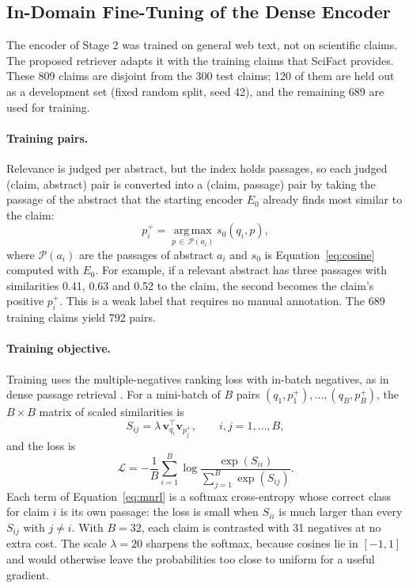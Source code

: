 \subsection{In-Domain Fine-Tuning of the Dense Encoder}
\label{sec:finetune}

The encoder of Stage 2 was trained on general web text, not on scientific claims. The proposed
retriever adapts it with the training claims that SciFact provides. These 809 claims are
disjoint from the 300 test claims; 120 of them are held out as a development set (fixed random
split, seed 42), and the remaining 689 are used for training.

\paragraph{Training pairs.} Relevance is judged per abstract, but the index holds passages, so
each judged (claim, abstract) pair is converted into a (claim, passage) pair by taking the
passage of the abstract that the starting encoder $E_0$ already finds most similar to the
claim:
\begin{equation}
p_i^{+} = \operatorname*{arg\,max}_{p \,\in\, \mathcal{P}(a_i)} s_0(q_i, p),
\label{eq:positive}
\end{equation}
where $\mathcal{P}(a_i)$ are the passages of abstract $a_i$ and $s_0$ is
Equation~\eqref{eq:cosine} computed with $E_0$. For example, if a relevant abstract has three
passages with similarities 0.41, 0.63 and 0.52 to the claim, the second becomes the claim's
positive $p_i^{+}$. This is a weak label that requires no manual annotation. The 689 training
claims yield 792 pairs.

\paragraph{Training objective.} Training uses the multiple-negatives ranking loss
\parencite{henderson2017smartreply} with in-batch negatives, as in dense passage retrieval
\parencite{karpukhin2020dpr}. For a mini-batch of $B$ pairs
$(q_1, p_1^{+}), \dots, (q_B, p_B^{+})$, the $B \times B$ matrix of scaled similarities is
\begin{equation}
S_{ij} = \lambda \, \mathbf{v}_{q_i}^{\top} \mathbf{v}_{p_j^{+}},
\qquad i, j = 1, \dots, B,
\label{eq:simmatrix}
\end{equation}
and the loss is
\begin{equation}
\mathcal{L} = -\frac{1}{B} \sum_{i=1}^{B}
\log \frac{\exp(S_{ii})}{\sum_{j=1}^{B} \exp(S_{ij})}.
\label{eq:mnrl}
\end{equation}
Each term of Equation~\eqref{eq:mnrl} is a softmax cross-entropy whose correct class for claim
$i$ is its own passage: the loss is small when $S_{ii}$ is much larger than every $S_{ij}$ with
$j \ne i$. With $B = 32$, each claim is contrasted with 31 negatives at no extra cost. The scale
$\lambda = 20$ sharpens the softmax, because cosines lie in $[-1, 1]$ and would otherwise leave
the probabilities too close to uniform for a useful gradient.

